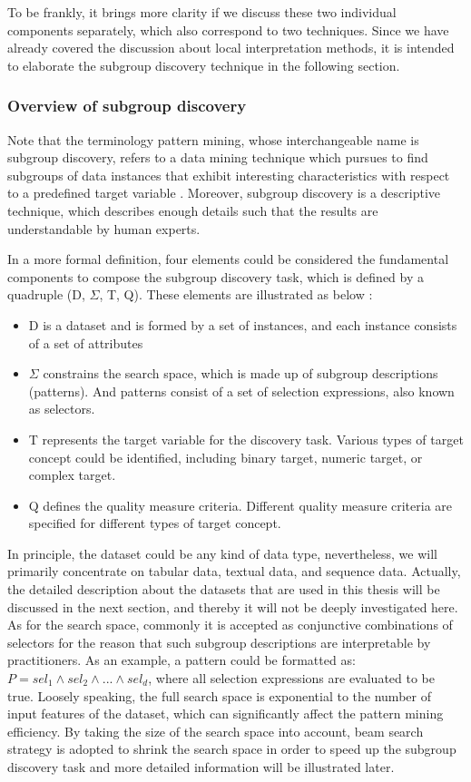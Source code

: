 To be frankly, it brings more clarity if we discuss these two individual components separately, which also correspond to two techniques. Since we have already covered the discussion about local interpretation methods, it is intended to elaborate the subgroup discovery technique in the following section.  

\subsubsection{Overview of subgroup discovery}

Note that the terminology pattern mining, whose interchangeable name is subgroup discovery, refers to a data mining technique which pursues to find subgroups of data instances that exhibit interesting characteristics with respect to a predefined target variable \cite{herrera2011overview}. Moreover, subgroup discovery is a descriptive technique, which describes enough details such that the results are understandable by human experts.

In a more formal definition, four elements could be considered the fundamental components to compose the subgroup discovery task, which is defined by a quadruple (D, $\Sigma$, T, Q). These elements are illustrated as below \cite{atzmueller2004towards} \cite{lemmerich2014novel}: 

\begin{itemize}
	\item D is a dataset and is formed by a set of instances, and each instance consists of a set of attributes
	\item $\Sigma$ constrains the search space, which is made up of subgroup descriptions (patterns). And patterns consist of a set of selection expressions, also known as selectors.
	\item T represents the target variable for the discovery task. Various types of target concept could be identified, including binary target, numeric target, or complex target. 
	\item Q defines the quality measure criteria. Different quality measure criteria are specified for different types of target concept. 
\end{itemize}

In principle, the dataset could be any kind of data type, nevertheless, we will primarily concentrate on tabular data, textual data, and sequence data. Actually, the detailed description about the datasets that are used in this thesis will be discussed in the next section, and thereby it will not be deeply investigated here. As for the search space, commonly it is accepted as conjunctive combinations of selectors for the reason that such subgroup descriptions are interpretable by practitioners. As an example, a pattern could be formatted as: $P = sel_1 \wedge sel_2 \wedge ... \wedge sel_d$, where all selection expressions are evaluated to be true. Loosely speaking, the full search space is exponential to the number of input features of the dataset, which can significantly affect the pattern mining efficiency. By taking the size of the search space into account, beam search strategy is adopted to shrink the search space in order to speed up the subgroup discovery task and more detailed information will be illustrated later. 

